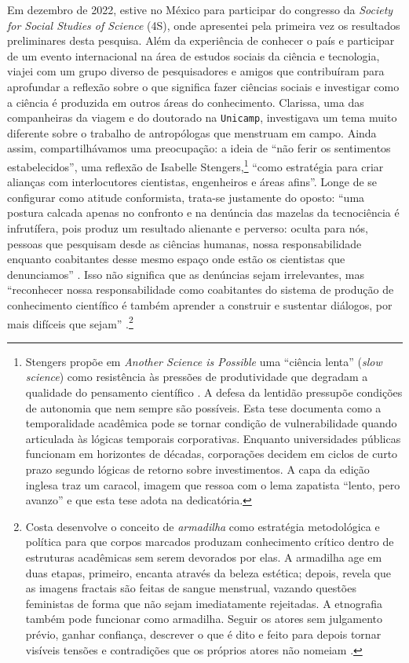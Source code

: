 Em dezembro de 2022, estive no México para participar do congresso da \textit{Society for Social Studies of Science} (4S), onde apresentei pela primeira vez os resultados preliminares desta pesquisa. Além da experiência de conhecer o país e participar de um evento internacional na área de estudos sociais da ciência e tecnologia, viajei com um grupo diverso de pesquisadores e amigos que contribuíram para aprofundar a reflexão sobre o que significa fazer ciências sociais e investigar como a ciência é produzida em outros áreas do conhecimento. Clarissa, uma das companheiras da viagem e do doutorado na \texttt{Unicamp}, investigava um tema muito diferente sobre o trabalho de antropólogas que menstruam em campo. Ainda assim, compartilhávamos uma preocupação: a ideia de ``não ferir os sentimentos estabelecidos'', uma reflexão de Isabelle Stengers,\footnote{Stengers propõe em \textit{Another Science is Possible} uma ``ciência lenta'' (\textit{slow science}) como resistência às pressões de produtividade que degradam a qualidade do pensamento científico \parencite{stengers2018another}. A defesa da lentidão pressupõe condições de autonomia que nem sempre são possíveis. Esta tese documenta como a temporalidade acadêmica pode se tornar condição de vulnerabilidade quando articulada às lógicas temporais corporativas. Enquanto universidades públicas funcionam em horizontes de décadas, corporações decidem em ciclos de curto prazo segundo lógicas de retorno sobre investimentos. A capa da edição inglesa traz um caracol, imagem que ressoa com o lema zapatista ``lento, pero avanzo'' e que esta tese adota na dedicatória.} ``como estratégia para criar alianças com interlocutores cientistas, engenheiros e áreas afins''. Longe de se configurar como atitude conformista, trata-se justamente do oposto: ``uma postura calcada apenas no confronto e na denúncia das mazelas da tecnociência é infrutífera, pois produz um resultado alienante e perverso: oculta para nós, pessoas que pesquisam desde as ciências humanas, nossa responsabilidade enquanto coabitantes desse mesmo espaço onde estão os cientistas que denunciamos'' \parencite[p. 314]{costa2024manchando}. Isso não significa que as denúncias sejam irrelevantes, mas ``reconhecer nossa responsabilidade como coabitantes do sistema de produção de conhecimento científico é também aprender a construir e sustentar diálogos, por mais difíceis que sejam'' \parencite[p. 314]{costa2024manchando}.\footnote{Costa desenvolve o conceito de \textit{armadilha} como estratégia metodológica e política para que corpos marcados produzam conhecimento crítico dentro de estruturas acadêmicas sem serem devorados por elas. A armadilha age em duas etapas, primeiro, encanta através da beleza estética; depois, revela que as imagens fractais são feitas de sangue menstrual, vazando questões feministas de forma que não sejam imediatamente rejeitadas. A etnografia também pode funcionar como armadilha. Seguir os atores sem julgamento prévio, ganhar confiança, descrever o que é dito e feito para depois tornar visíveis tensões e contradições que os próprios atores não nomeiam \parencite{costa2024manchando}.}

